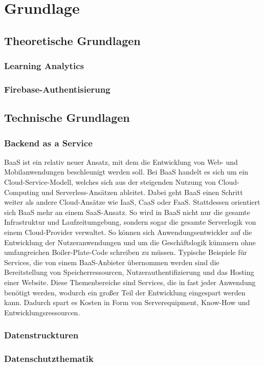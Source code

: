 \chapter{Grundlage} %
\section{Theoretische Grundlagen}
\subsection{Learning Analytics}
\subsection{Firebase-Authentisierung}


\section{Technische Grundlagen}

\subsection{Backend as a Service}
\ac{BaaS} ist ein relativ neuer Ansatz, mit dem die Entwicklung von Web- und Mobilanwendungen beschleunigt werden soll.
Bei \ac{BaaS} handelt es sich um ein Cloud-Service-Modell, welches sich aus der steigenden Nutzung von Cloud-Computing und Serverless-Ansätzen ableitet.
Dabei geht \ac{BaaS} einen Schritt weiter als andere Cloud-Ansätze wie \ac{IaaS}, \ac{CaaS} oder \ac{FaaS}.
Stattdessen orientiert sich \ac{BaaS} mehr an einem \ac{SaaS}-Ansatz. %
So wird in \ac{BaaS} nicht nur die gesamte Infrastruktur und Laufzeitumgebung, sondern sogar die gesamte Serverlogik von einem Cloud-Provider verwaltet.
So können sich Anwendungsentwickler auf die Entwicklung der Nutzeranwendungen und um die Geschäftslogik kümmern ohne umfangreichen Boiler-Plate-Code schreiben zu müssen.
Typische Beispiele für Services, die von einem \ac{BaaS}-Anbieter übernommen werden sind die Bereitstellung von Speicherressourcen, Nutzerauthentifizierung und das Hosting einer Website.
Diese Themenbereiche sind Services, die in fast jeder Anwendung benötigt werden, wodurch ein großer Teil der Entwicklung eingespart werden kann.
Dadurch spart es Kosten in Form von Serverequipment, Know-How und Entwicklungsressourcen.




\subsection{Datenstruckturen}
\subsection{Datenschutzthematik}
